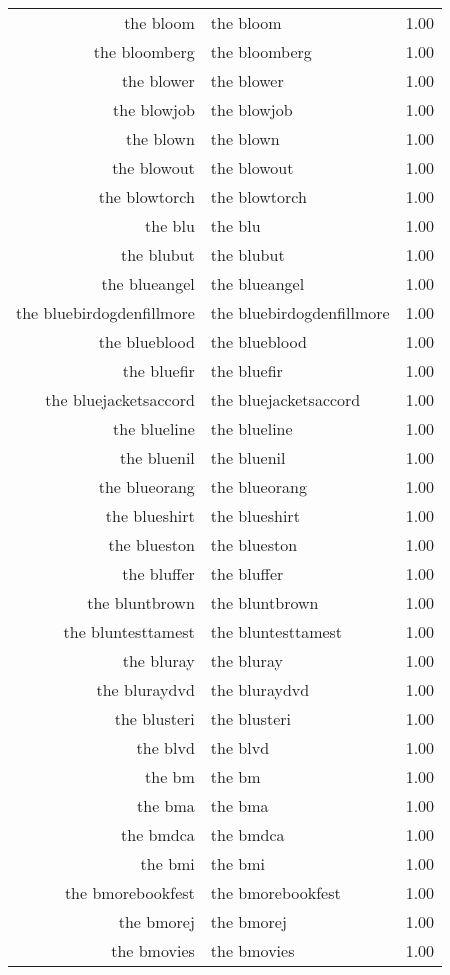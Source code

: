 \begin{table}[ht]
\begin{tabular}{rlr}
  the bloom & the bloom & 1.00 \\ 
  the bloomberg & the bloomberg & 1.00 \\ 
  the blower & the blower & 1.00 \\ 
  the blowjob & the blowjob & 1.00 \\ 
  the blown & the blown & 1.00 \\ 
  the blowout & the blowout & 1.00 \\ 
  the blowtorch & the blowtorch & 1.00 \\ 
  the blu & the blu & 1.00 \\ 
  the blubut & the blubut & 1.00 \\ 
  the blueangel & the blueangel & 1.00 \\ 
  the bluebirdogdenfillmore & the bluebirdogdenfillmore & 1.00 \\ 
  the blueblood & the blueblood & 1.00 \\ 
  the bluefir & the bluefir & 1.00 \\ 
  the bluejacketsaccord & the bluejacketsaccord & 1.00 \\ 
  the blueline & the blueline & 1.00 \\ 
  the bluenil & the bluenil & 1.00 \\ 
  the blueorang & the blueorang & 1.00 \\ 
  the blueshirt & the blueshirt & 1.00 \\ 
  the blueston & the blueston & 1.00 \\ 
  the bluffer & the bluffer & 1.00 \\ 
  the bluntbrown & the bluntbrown & 1.00 \\ 
  the bluntesttamest & the bluntesttamest & 1.00 \\ 
  the bluray & the bluray & 1.00 \\ 
  the bluraydvd & the bluraydvd & 1.00 \\ 
  the blusteri & the blusteri & 1.00 \\ 
  the blvd & the blvd & 1.00 \\ 
  the bm & the bm & 1.00 \\ 
  the bma & the bma & 1.00 \\ 
  the bmdca & the bmdca & 1.00 \\ 
  the bmi & the bmi & 1.00 \\ 
  the bmorebookfest & the bmorebookfest & 1.00 \\ 
  the bmorej & the bmorej & 1.00 \\ 
  the bmovies & the bmovies & 1.00 \\ 

\end{tabular}
\end{table}
